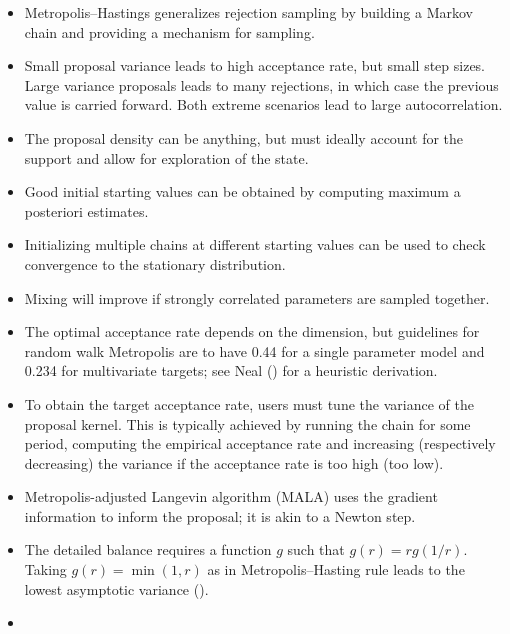 \documentclass[
  11pt,
  letterpaper,
]{scrbook}
\providecommand{\tightlist}{%
  \setlength{\itemsep}{0pt}\setlength{\parskip}{0pt}}\usepackage{longtable,booktabs,array}
\theoremstyle{definition}
\theoremstyle{definition}
\theoremstyle{definition}
\theoremstyle{plain}
\theoremstyle{plain}
\theoremstyle{plain}
\theoremstyle{remark}
\begin{document}
\begin{tcolorbox}[enhanced jigsaw, opacitybacktitle=0.6, title=\textcolor{quarto-callout-important-color}{\faExclamation}\hspace{0.5em}{\textbf{Summary}:}, colback=white, coltitle=black, colframe=quarto-callout-important-color-frame, arc=.35mm, colbacktitle=quarto-callout-important-color!10!white, opacityback=0, breakable, rightrule=.15mm, left=2mm, toptitle=1mm, titlerule=0mm, bottomrule=.15mm, toprule=.15mm, leftrule=.75mm, bottomtitle=1mm]

\begin{itemize}
\tightlist
\item
  Metropolis--Hastings generalizes rejection sampling by building a
  Markov chain and providing a mechanism for sampling.
\item
  Small proposal variance leads to high acceptance rate, but small step
  sizes. Large variance proposals leads to many rejections, in which
  case the previous value is carried forward. Both extreme scenarios
  lead to large autocorrelation.
\item
  The proposal density can be anything, but must ideally account for the
  support and allow for exploration of the state.
\item
  Good initial starting values can be obtained by computing maximum a
  posteriori estimates.
\item
  Initializing multiple chains at different starting values can be used
  to check convergence to the stationary distribution.
\item
  Mixing will improve if strongly correlated parameters are sampled
  together.
\item
  The optimal acceptance rate depends on the dimension, but guidelines
  for random walk Metropolis are to have 0.44 for a single parameter
  model and 0.234 for multivariate targets; see Neal
  () for a heuristic derivation.
\item
  To obtain the target acceptance rate, users must tune the variance of
  the proposal kernel. This is typically achieved by running the chain
  for some period, computing the empirical acceptance rate and
  increasing (respectively decreasing) the variance if the acceptance
  rate is too high (too low).
\item
  Metropolis-adjusted Langevin algorithm (MALA) uses the gradient
  information to inform the proposal; it is akin to a Newton step.
\item
  The detailed balance requires a function \(g\) such that
  \(g(r) = rg(1/r).\) Taking \(g(r) = \min(1,r)\) as in
  Metropolis--Hasting rule leads to the lowest asymptotic variance
  ().
\item
\end{itemize}

\end{tcolorbox}
\end{document}
